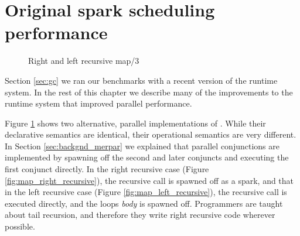 \section{Original spark scheduling performance}
\label{sec:original_scheduling_performance}

\begin{figure}
\begin{center}
%
\end{center}
\caption{Right and left recursive map/3}
\label{fig:map_right_and_left_recursive}
\end{figure}

Section \ref{sec:gc} we ran our benchmarks with a recent version of the
runtime system.
In the rest of this chapter we describe many of the improvements to the
runtime system that improved parallel performance.

Figure \ref{fig:map_right_and_left_recursive} shows two alternative, parallel
implementations of .
While their declarative semantics are identical,
their operational semantics are very different.
In Section \ref{sec:backgnd_merpar} we explained that parallel conjunctions
are implemented by spawning off the second and later conjuncts and executing
the first conjunct directly.
In the right recursive case (Figure \ref{fig:map_right_recursive}),
the recursive call is spawned off as a spark,
and that in the left recursive case (Figure \ref{fig:map_left_recursive}),
the recursive call is executed directly, and the loops \emph{body} is
spawned off.
Programmers are taught about tail recursion,
and therefore they write right recursive code wherever possible.

